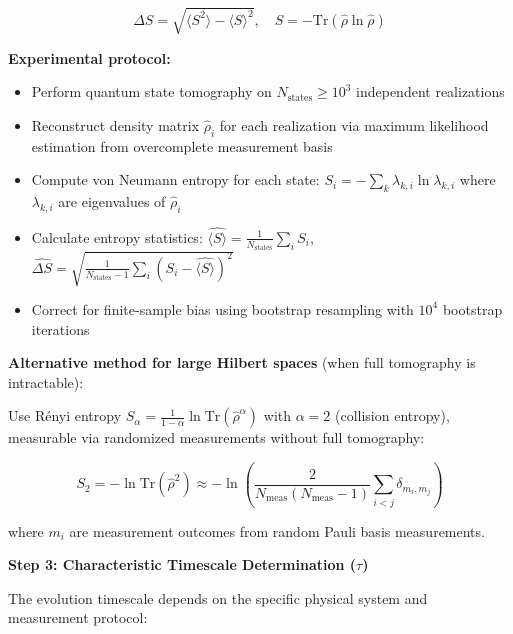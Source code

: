 \documentclass[11pt,a4paper,twoside]{article}
\begin{document}
\begin{tcolorbox}[colback=blue!5!white,colframe=blue!75!black,title=\textbf{K-Parameter Estimator Pipeline}]
\begin{equation}
\Delta S = \sqrt{\langle S^2 \rangle - \langle S \rangle^2}, \quad S = -\text{Tr}(\hat{\rho} \ln \hat{\rho})
\end{equation}

\textbf{Experimental protocol:}
\begin{itemize}[leftmargin=*]
    \item Perform quantum state tomography on $N_{\text{states}} \geq 10^3$ independent realizations
    \item Reconstruct density matrix $\hat{\rho}_i$ for each realization via maximum likelihood estimation from overcomplete measurement basis
    \item Compute von Neumann entropy for each state: $S_i = -\sum_k \lambda_{k,i} \ln \lambda_{k,i}$ where $\lambda_{k,i}$ are eigenvalues of $\hat{\rho}_i$
    \item Calculate entropy statistics: $\hat{\langle S \rangle} = \frac{1}{N_{\text{states}}}\sum_i S_i$, \quad $\widehat{\Delta S} = \sqrt{\frac{1}{N_{\text{states}}-1}\sum_i (S_i - \hat{\langle S \rangle})^2}$
    \item Correct for finite-sample bias using bootstrap resampling with $10^4$ bootstrap iterations
\end{itemize}

\textbf{Alternative method for large Hilbert spaces} (when full tomography is intractable):

Use Rényi entropy $S_\alpha = \frac{1}{1-\alpha}\ln\text{Tr}(\hat{\rho}^\alpha)$ with $\alpha = 2$ (collision entropy), measurable via randomized measurements without full tomography:

\begin{equation}
S_2 = -\ln\text{Tr}(\hat{\rho}^2) \approx -\ln\left(\frac{2}{N_{\text{meas}}(N_{\text{meas}}-1)}\sum_{i<j}\delta_{m_i,m_j}\right)
\end{equation}

where $m_i$ are measurement outcomes from random Pauli basis measurements.

\textbf{Step 3: Characteristic Timescale Determination ($\tau$)}

The evolution timescale depends on the specific physical system and measurement protocol:


\end{tcolorbox}
\end{document}
